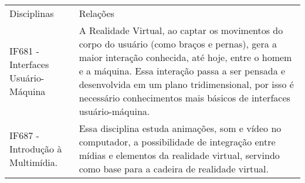 \documentclass{article}
\begin{document}
\begin{table}[h]
 \centering
 {\renewcommand\arraystretch{1.25}

 \begin{tabular}{ l l }
  \cline{1-1}\cline{2-2}  
    \multicolumn{1}{|p{3.850cm}|}{Disciplinas \centering } &
    \multicolumn{1}{p{4.217cm}|}{Relações \centering }
  \\  
  \cline{1-1}\cline{2-2}  
    \multicolumn{1}{|p{3.850cm}|}{IF681 - Interfaces Usuário-Máquina  \centering } & \multicolumn{1}{p{4.217cm}|}{A Realidade Virtual, ao captar os movimentos do corpo do usuário (como braços e pernas), gera a maior interação conhecida, até hoje, entre o homem e a máquina. Essa interação passa a ser pensada e desenvolvida em um plano tridimensional, por isso é necessário conhecimentos mais básicos de interfaces usuário-máquina. \citep{grv_pucrs}}
  \\  
  \cline{1-1}\cline{2-2}  
    \multicolumn{1}{|p{3.850cm}|}{IF687 - Introdução à Multimídia. \centering } &
    \multicolumn{1}{p{4.217cm}|}{ Essa disciplina estuda animações, som e vídeo no computador, a possibilidade de integração entre mídias e elementos da realidade virtual, servindo como base para a cadeira de realidade virtual. \citep{ccufpe}}
  \\  
  \hline

 \end{tabular} }
\end{table}





\end{document}
